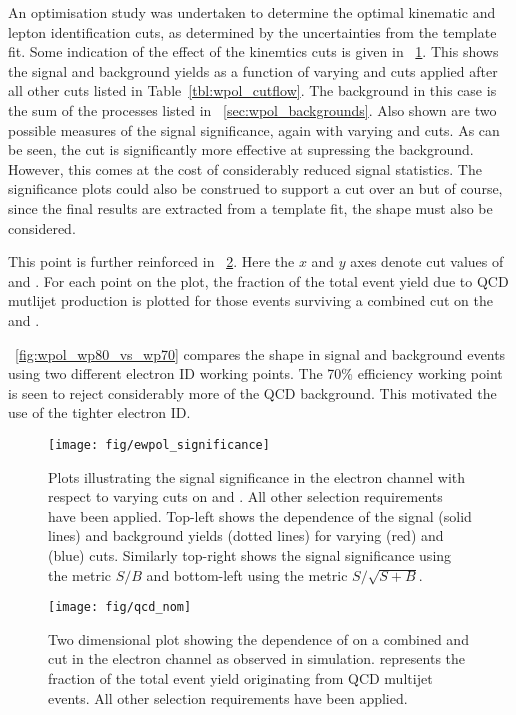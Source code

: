 An optimisation study was undertaken to determine the optimal kinematic and
lepton identification cuts, as determined by the uncertainties from the template
fit. Some indication of the effect of the kinemtics cuts is given in
\fig~\ref{fig:wpol_ele_significance}. This shows the signal and background
yields as a function of varying \MET and \MT cuts applied after all other cuts
listed in Table~\ref{tbl:wpol_cutflow}. The background in this case is the sum
of the processes listed in \sec~\ref{sec:wpol_backgrounds}. Also shown are
two possible measures of the signal significance, again with varying \MET and
\MT cuts. As can be seen, the \MET cut is significantly more effective at
supressing the background. However, this comes at the cost of considerably
reduced signal statistics. The significance plots could also be construed to
support a \MET cut over an \MT but of course, since the final results are
extracted from a template fit, the \LP shape must also be considered.

This point is further reinforced in \fig~\ref{fig:wpol_met_mt_fqcd}. Here the
$x$ and $y$ axes denote cut values of \MET and \MT. For each point on the plot,
the fraction of the total event yield due to \ac{QCD} mutlijet production is
plotted for those events surviving a combined cut on the \MET and \MT.

\fig~\ref{fig:wpol_wp80_vs_wp70} compares the \LP shape in signal and
background events using two different electron ID working points. The 70\%
efficiency working point is seen to reject considerably more of the \ac{QCD}
background. This motivated the use of the tighter electron ID.

\begin{figure}
\texttt{[image: fig/ewpol\_significance]}
\caption[Plots illustrating the signal significance in the electron channel with
respect to varying cuts on \MET and \MT.]{Plots illustrating the signal
  significance in the electron channel with respect to varying cuts on \MET and
  \MT. All other selection requirements have been applied. Top-left shows the
  dependence of the signal (solid lines) and background yields (dotted lines)
  for varying \MET (red) and \MT (blue) cuts. Similarly top-right shows the
  signal significance using the metric $S/B$ and bottom-left using the metric
  $S/\sqrt{S+B}$.}
\label{fig:wpol_ele_significance}
\end{figure}

\begin{figure}
\texttt{[image: fig/qcd\_nom]}
\caption{Two dimensional plot showing the dependence of \fQCD on a combined \MET
  and \MT cut in the electron channel as observed in simulation. \fQCD
  represents the fraction of the total event yield originating from \ac{QCD}
  multijet events. All other selection requirements have been applied. }
\label{fig:wpol_met_mt_fqcd}
\end{figure}

